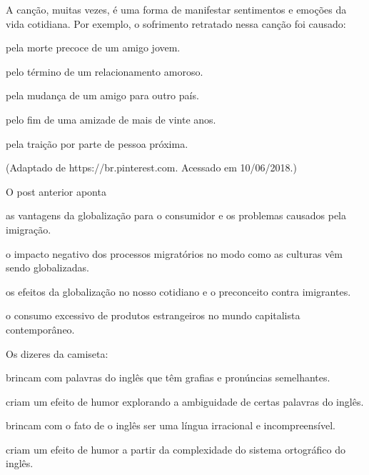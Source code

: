 A canção, muitas vezes, é uma forma de manifestar sentimentos e emoções da vida cotidiana. Por exemplo, o sofrimento retratado nessa canção foi causado:

\begin{alternativas}
  \item pela morte precoce de um amigo jovem.
  \item pelo término de um relacionamento amoroso.
  \item pela mudança de um amigo para outro país.
  \item pelo fim de uma amizade de mais de vinte anos.
  \item pela traição por parte de pessoa próxima.
\end{alternativas}


\questao
{} {
  (Adaptado de https://br.pinterest.com. Acessado em 10/06/2018.)
}

O post anterior aponta
\begin{alternativas}
  \item as vantagens da globalização para o consumidor e os problemas causados pela imigração.
  \item o impacto negativo dos processos migratórios no modo como as culturas vêm sendo globalizadas.
  \item os efeitos da globalização no nosso cotidiano e o preconceito contra imigrantes.
  \item o consumo excessivo de produtos estrangeiros no mundo capitalista contemporâneo.
\end{alternativas}


\questao
Os dizeres da camiseta:
\begin{alternativas}
  \item brincam com palavras do inglês que têm grafias e pronúncias semelhantes.
  \item criam um efeito de humor explorando a ambiguidade de certas palavras do inglês.
  \item brincam com o fato de o inglês ser uma língua irracional e incompreensível.
  \item criam um efeito de humor a partir da complexidade do sistema ortográfico do inglês.
\end{alternativas}

